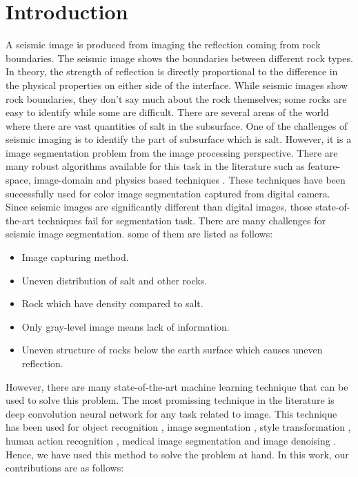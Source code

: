 \documentclass[conference]{IEEEtran}
\begin{document}
\section{Introduction}
A seismic image is produced from imaging the reflection coming from rock boundaries. The seismic image shows the boundaries between different rock types. In theory, the strength of reflection is directly proportional to the difference in the physical properties on either side of the interface. While seismic images show rock boundaries, they don't say much about the rock themselves; some rocks are easy to identify while some are difficult. There are several areas of the world where there are vast quantities of salt in the subsurface. One of the challenges of seismic imaging is to identify the part of subsurface which is salt. However, it is a image segmentation problem from the image processing perspective. There are many robust algorithms available for this task in the literature such as feature-space, image-domain and  physics based techniques \cite{lucchese2001colour}. These techniques have been successfully used for color image segmentation captured from digital camera. Since seismic images are significantly different than digital images, those state-of-the-art techniques fail for segmentation task. There are many challenges for seismic image segmentation. some of them are listed as follows:
\begin{itemize}
	\item Image capturing method.
	\item Uneven distribution of salt and other rocks.
	\item Rock which have density compared to salt.
	\item Only gray-level image means lack of information.
	\item Uneven structure of rocks below the earth surface which causes uneven reflection. 
\end{itemize}

However, there are many state-of-the-art machine learning technique that can be used to solve this problem. The most promissing technique in the literature is deep convolution neural network for any task related to image. This technique has been used for object recognition \cite{ren2015faster}, image segmentation \cite{chen2018deeplab}, style transformation \cite{etemad20093d}, human action recognition \cite{ji20133d}, medical image segmentation \cite{milletari2016v} and image denoising \cite{zhang2017beyond}. Hence, we have used this method to solve the problem at hand. In this work, our contributions are as follows:
\end{document}
